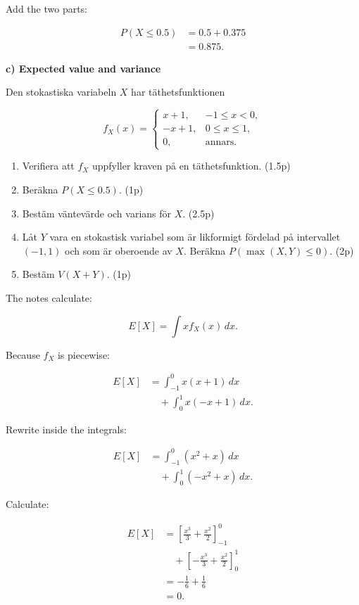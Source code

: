 \documentclass[10pt]{article}
\begin{document}
Add the two parts:

\begin{align*}
P(X\le 0.5)
&=0.5+0.375 \\[2mm]
&=0.875.
\end{align*}

\textbf{c) Expected value and variance}

Den stokastiska variabeln \(X\) har täthetsfunktionen

\[
f_X(x)=
\begin{cases}
x+1, & -1\le x<0,\\
-x+1, & 0\le x\le 1,\\
0, & \text{annars}.
\end{cases}
\]

\begin{enumerate}[label=\alph*)]
\item Verifiera att \(f_X\) uppfyller kraven på en
täthetsfunktion.
\hfill (1.5p)

\item Beräkna \(P(X\le 0.5)\).
\hfill (1p)

\item Bestäm väntevärde och varians för \(X\).
\hfill (2.5p)

\item Låt \(Y\) vara en stokastisk variabel som är
likformigt fördelad på intervallet \((-1,1)\) och som
är oberoende av \(X\).
Beräkna \(P(\max(X,Y)\le 0)\).
\hfill (2p)

\item Bestäm \(V(X+Y)\).
\hfill (1p)
\end{enumerate}

The notes calculate:

\[
E[X]
=
\int x f_X(x)\,dx.
\]

Because \(f_X\) is piecewise:

\begin{align*}
E[X]
&=
\int_{-1}^{0}x(x+1)\,dx \\
&\quad+
\int_{0}^{1}x(-x+1)\,dx.
\end{align*}

Rewrite inside the integrals:

\begin{align*}
E[X]
&=
\int_{-1}^{0}(x^2+x)\,dx \\
&\quad+
\int_{0}^{1}(-x^2+x)\,dx.
\end{align*}

Calculate:

\begin{align*}
E[X]
&=
\left[
\frac{x^3}{3}
+\frac{x^2}{2}
\right]_{-1}^{0} \\
&\quad+
\left[
-\frac{x^3}{3}
+\frac{x^2}{2}
\right]_{0}^{1} \\[2mm]
&=
-\frac{1}{6}
+\frac{1}{6} \\[2mm]
&=0.
\end{align*}
\end{document}
